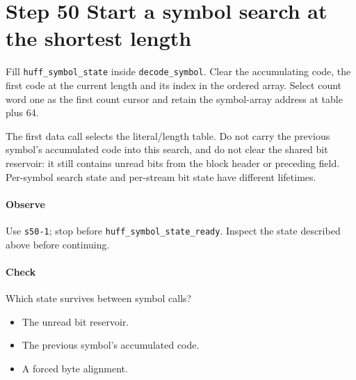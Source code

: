 \section{Step 50 Start a symbol search at the shortest length}\label{png-huff-s50}
Fill \texttt{huff\_symbol\_state} inside \texttt{decode\_symbol}. Clear the accumulating code, the first code at the current length and its index in the ordered array. Select count word one as the first count cursor and retain the symbol-array address at table plus 64.

The first data call selects the literal/length table. Do not carry the previous symbol's accumulated code into this search, and do not clear the shared bit reservoir: it still contains unread bits from the block header or preceding field. Per-symbol search state and per-stream bit state have different lifetimes.

\paragraph{Observe} Use \texttt{s50-1}; stop before \texttt{huff\_symbol\_state\_ready}. Inspect the state described above before continuing.

\paragraph{Check} Which state survives between symbol calls?
\begin{itemize}
\item[A.] The unread bit reservoir.
\item[B.] The previous symbol’s accumulated code.
\item[C.] A forced byte alignment.
\end{itemize}

